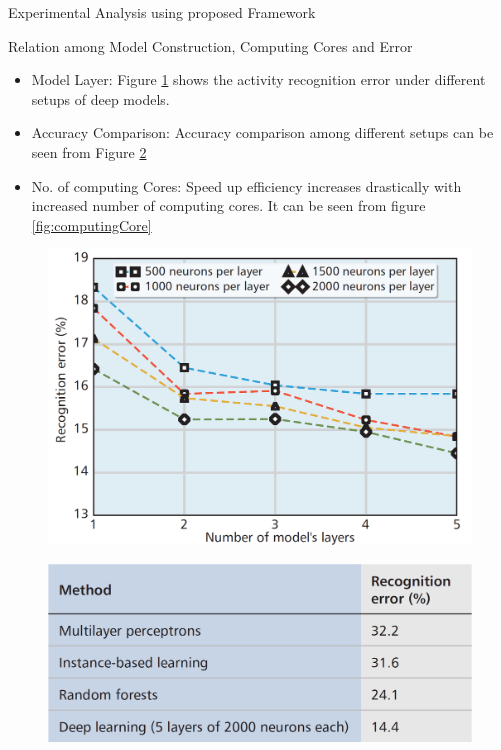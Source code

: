 \documentclass[newPxFont]{beamer}
\begin{document}
\begin{frame}[allowframebreaks]{Experimental Analysis using proposed Framework}
\begin{block}{Relation among Model Construction, 
    Computing Cores and Error}
    	\begin{itemize}
			\item{\alert{Model Layer: } Figure \ref{fig:deepModelImpact} shows the activity recognition error under different setups of deep models.}
            \item{\alert{Accuracy Comparison: } Accuracy comparison among different setups can be seen from Figure \ref{fig:deepModelSetupPerformance}}
            \item{\alert{No. of computing Cores: } Speed up efficiency increases drastically with increased number of computing cores. It can be seen from figure \ref{fig:computingCore}}
        \end{itemize}
    \end{block}
    \begin{figure}
		\centering
		\includegraphics[width=.75\linewidth]{resources/analysis2.png}
        \label{fig:deepModelImpact}
	\end{figure}
    
    \framebreak 
    
    \begin{figure}
		\centering
		\includegraphics[width=.9\linewidth]{resources/performance2.png}
        \label{fig:deepModelSetupPerformance}
	\end{figure}
    

\end{frame}
\end{document}
